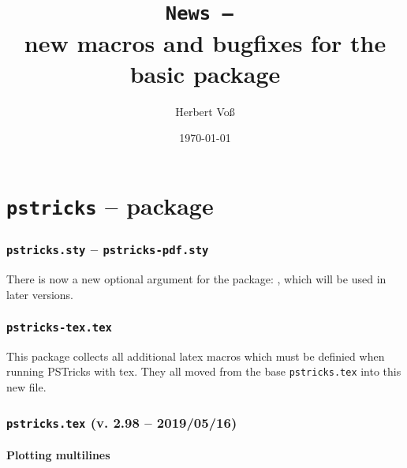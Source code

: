 \documentclass[11pt,english,BCOR=10mm,DIV=12,bibliography=totoc,parskip=false,headings=small,
    headinclude=false,footinclude=false,twoside]{pst-doc}
\begin{document}
\title{\texttt{News -- \the\year}\\ \Large new macros and bugfixes for the
basic package }
\author{Herbert Voß}
\date{\today}

\maketitle

\clearpage
\tableofcontents

\clearpage
\part{\texttt{pstricks} -- package}

\section{\texttt{pstricks.sty} -- \texttt{pstricks-pdf.sty}}

There is now a new optional argument for the package: , which will
be used in later versions. 
 
\section{\texttt{pstricks-tex.tex}}
This package collects all additional latex macros which must be definied
when running PSTricks with tex.  They all moved from the base \texttt{pstricks.tex} into
this new file.


\section{\texttt{pstricks.tex} (v. 2.98 -- 2019/05/16)}

\subsection{Plotting multilines}
\end{document}
